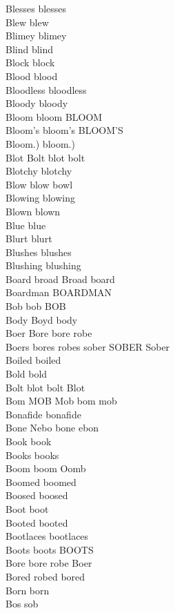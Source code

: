 Blesses blesses\\
Blew blew\\
Blimey blimey\\
Blind blind\\
Block block\\
Blood blood\\
Bloodless bloodless\\
Bloody bloody\\
Bloom bloom BLOOM\\
Bloom's bloom's BLOOM'S\\
Bloom.) bloom.)\\
Blot Bolt blot bolt\\
Blotchy blotchy\\
Blow blow bowl\\
Blowing blowing\\
Blown blown\\
Blue blue\\
Blurt blurt\\
Blushes blushes\\
Blushing blushing\\
Board broad Broad board\\
Boardman BOARDMAN\\
Bob bob BOB\\
Body Boyd body\\
Boer Bore bore robe\\
Boers bores robes sober SOBER Sober\\
Boiled boiled\\
Bold bold\\
Bolt blot bolt Blot\\
Bom MOB Mob bom mob\\
Bonafide bonafide\\
Bone Nebo bone ebon\\
Book book\\
Books books\\
Boom boom Oomb\\
Boomed boomed\\
Boosed boosed\\
Boot boot\\
Booted booted\\
Bootlaces bootlaces\\
Boots boots BOOTS\\
Bore bore robe Boer\\
Bored robed bored\\
Born born\\
Bos sob\\
